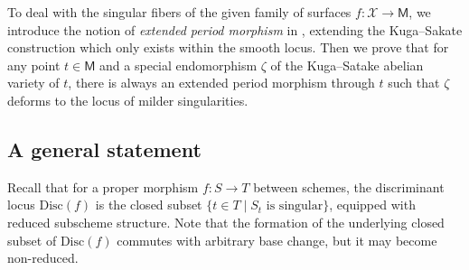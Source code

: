 \documentclass[11pt, letterpaper]{amsart}
\theoremstyle{plain}
\theoremstyle{definition}
\newcommand{\<}{\langle}
\renewcommand{\>}{\rangle}
\newcommand{\sfM}{\mathsf{M}}
\begin{document}
To deal with the singular fibers of the given family of surfaces $f:\mathcal{X}\to \sfM$, we introduce the notion of \emph{extended period morphism} in , extending the Kuga--Sakate construction which only exists within the smooth locus.
Then we prove that for any point $t\in \sfM$ and a special endomorphism $\zeta$ of the Kuga--Satake abelian variety of $t$, there is always an extended period morphism through $t$ such that $\zeta$ deforms to the locus of milder singularities.


\subsection{A general statement}
\label{sec: general}

Recall that for a proper morphism $f : S \to T$ between schemes, the discriminant locus $\mathrm{Disc}(f)$ is the closed subset $\{ t \in T \mid S_t \textrm{ is singular} \}$, equipped with reduced subscheme structure. 
Note that the formation of the underlying closed subset of $\mathrm{Disc}(f)$ commutes with arbitrary base change, but it may become non-reduced.
\end{document}

